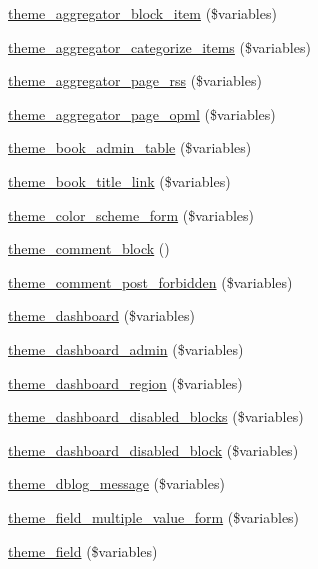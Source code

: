 \begin{DoxyCompactItemize}
\item 
\hyperlink{group__themeable_ga311e62f08cc510fe7e50477485f54943}{theme\_\-aggregator\_\-block\_\-item} (\$variables)
\item 
\hyperlink{group__themeable_gaa166f4c160bdff7532ce6b75a8588d02}{theme\_\-aggregator\_\-categorize\_\-items} (\$variables)
\item 
\hyperlink{group__themeable_ga458bff845ec41963f5acb8a81561ef98}{theme\_\-aggregator\_\-page\_\-rss} (\$variables)
\item 
\hyperlink{group__themeable_ga1faa7b7c87cd772cb1005e83bb331616}{theme\_\-aggregator\_\-page\_\-opml} (\$variables)
\item 
\hyperlink{group__themeable_gad9629dbe505d7b381ba96e62496035bc}{theme\_\-book\_\-admin\_\-table} (\$variables)
\item 
\hyperlink{group__themeable_ga81c31dd7bcb8dda4679c9857b95621c8}{theme\_\-book\_\-title\_\-link} (\$variables)
\item 
\hyperlink{group__themeable_ga08f8bd750587602eebbd205d192dbe9c}{theme\_\-color\_\-scheme\_\-form} (\$variables)
\item 
\hyperlink{group__themeable_gaa980a6cc6eeb012e7255fe0351a332ba}{theme\_\-comment\_\-block} ()
\item 
\hyperlink{group__themeable_ga161f469ee8e0de3c126729f154863a11}{theme\_\-comment\_\-post\_\-forbidden} (\$variables)
\item 
\hyperlink{group__themeable_ga6c02d8ffcbb05e9a3b8a6159588ea756}{theme\_\-dashboard} (\$variables)
\item 
\hyperlink{group__themeable_gaa23f321cda9a9681189b56dde889c5be}{theme\_\-dashboard\_\-admin} (\$variables)
\item 
\hyperlink{group__themeable_ga2f5b5b4f1677e2768387c88b6532164c}{theme\_\-dashboard\_\-region} (\$variables)
\item 
\hyperlink{group__themeable_ga8ac4d0963e51b469850301e4c1e85cb6}{theme\_\-dashboard\_\-disabled\_\-blocks} (\$variables)
\item 
\hyperlink{group__themeable_ga4a956aaf4c079a8d60542ed1ad9f3b9e}{theme\_\-dashboard\_\-disabled\_\-block} (\$variables)
\item 
\hyperlink{group__themeable_ga4f279aabc6c186be3cf3a04b6bb94f8a}{theme\_\-dblog\_\-message} (\$variables)
\item 
\hyperlink{group__themeable_ga74b93c09d317f6348b32ad1e6695c61e}{theme\_\-field\_\-multiple\_\-value\_\-form} (\$variables)
\item 
\hyperlink{group__themeable_gaee35966f09683ab054aef8f6fd022d2c}{theme\_\-field} (\$variables)

\end{DoxyCompactItemize}

